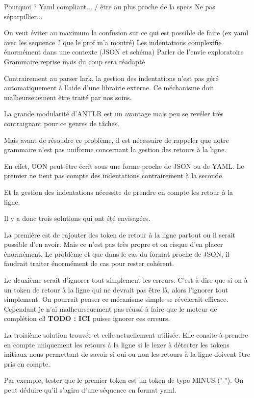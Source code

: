 \documentclass[
    iict, %
    il, %
]{heig-tb}
\begin{document}
Pourquoi ? Yaml compliant... / être au plus proche de la specs
Ne pas séparpillier...

On veut éviter au maximum la confusion sur ce qui est possible de faire (ex yaml avec les sequence ? que le prof m'a montré)
Les indentations complexifie énormément dans une contexte (JSON et schéma)
Parler de l'envie exploratoire
Grammaire reprise mais du coup sera réadapté

Contrairement au parser lark, la gestion des indentations n'est pas géré automatiquement à l'aide d'une librairie externe.
Ce méchanisme doit malheurseuement être traité par nos soins.

La grande modularité d'ANTLR est un avantage mais peu se revéler très contraignant pour ce genres de tâches.

Mais avant de résoudre ce problème, il est nécessaire de rappeler que notre grammaire n'est pas uniforme concernant la gestion des retours à la ligne.

En effet, UON peut-être écrit sous une forme proche de JSON ou de YAML. Le premier ne tient pas compte des indentations contrairement à la seconde.

Et la gestion des indentations nécessite de prendre en compte les retour à la ligne. %

Il y a donc trois solutions qui ont été envisagées.

La première est de rajouter des token de retour à la ligne partout ou il serait possible d'en avoir. Mais ce n'est pas très propre et on risque d'en placer énormément.
Le problème et que dans le cas du format proche de JSON, il faudrait traiter énormément de cas pour rester cohérent.

Le deuxième serait d'ignorer tout simplement les erreurs. C'est à dire que si on à un token de retour à la ligne qui ne devrait pas être là, alors l'ignorer tout simplement.
On pourrait penser ce mécanisme simple se révelerait efficace. Cependant je n'ai malheurseuement pas réussi à faire que le moteur de complétion c3 \textbf{TODO : ICI}
puisse ignorer ces erreurs.

La troisième solution trouvée et celle actuellement utilisée. Elle consite à prendre en compte uniquement les retours à la ligne si le lexer à détecter les tokens initiaux
nous permettant de savoir si oui ou non les retours à la ligne doivent être pris en compte.

Par exemple, tester que le premier token est un token de type MINUS ("-"). On peut déduire qu'il s'agira d'une séquence en format yaml. %
\end{document}

